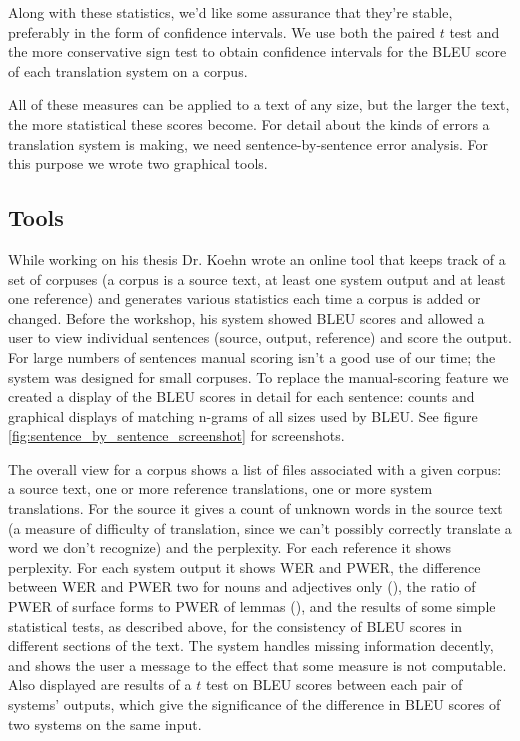 \documentclass[10pt]{report}
\theoremstyle{plain}
\begin{document}
{Along with these statistics, we'd like some assurance that they're stable, preferably in the form of confidence intervals. We use both the paired $t$ test and the more conservative sign test to obtain confidence intervals for the BLEU score of each translation system on a corpus.

All of these measures can be applied to a text of any size, but the larger the text, the more statistical these scores become. For detail about the kinds of errors a translation system is making, we need sentence-by-sentence error analysis. For this purpose we wrote two graphical tools.

\subsection{Tools}
While working on his thesis Dr. Koehn wrote an online tool that keeps track of a set of corpuses (a corpus is a source text, at least one system output and at least one reference) and generates various statistics each time a corpus is added or changed. Before the workshop, his system showed BLEU scores and allowed a user to view individual sentences (source, output, reference) and score the output. For large numbers of sentences manual scoring isn't a good use of our time; the system was designed for small corpuses. To replace the manual-scoring feature we created a display of the BLEU scores in detail for each sentence: counts and graphical displays of matching n-grams of all sizes used by BLEU. See figure \ref{fig:sentence_by_sentence_screenshot} for screenshots.

The overall view for a corpus shows a list of files associated with a given corpus: a source text, one or more reference translations, one or more system translations. For the source it gives a count of unknown words in the source text (a measure of difficulty of translation, since we can't possibly correctly translate a word we don't recognize) and the perplexity. For each reference it shows perplexity. For each system output it shows WER and PWER, the difference between WER and PWER two for nouns and adjectives only (\cite{errMeasures}), the ratio of PWER of surface forms to PWER of lemmas (\cite{errMeasures}), and the results of some simple statistical tests, as described above, for the consistency of BLEU scores in different sections of the text. The system handles missing information decently, and shows the user a message to the effect that some measure is not computable. Also displayed are results of a $t$ test on BLEU scores between each pair of systems' outputs, which give the significance of the difference in BLEU scores of two systems on the same input.

}
\end{document}
